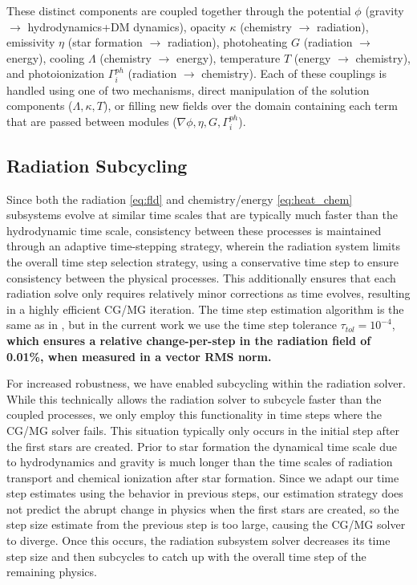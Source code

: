 These distinct components are coupled together through the potential
$\phi$ (gravity $\to$ hydrodynamics+DM dynamics), opacity $\kappa$ (chemistry
$\to$ radiation), emissivity $\eta$ (star formation $\to$ radiation),
photoheating $G$ (radiation $\to$ energy), cooling $\Lambda$
(chemistry $\to$ energy), temperature $T$ (energy $\to$ chemistry),
and photoionization $\Gamma_i^{ph}$ (radiation $\to$ chemistry).  Each
of these couplings is handled using one of two mechanisms, direct
manipulation of the solution components ($\Lambda, \kappa, T$), or
filling new fields over the domain containing each term that are
passed between modules ($\nabla\phi, \eta, G, \Gamma_i^{ph}$).

\subsection{Radiation Subcycling}
Since both the radiation \eqref{eq:fld} and chemistry/energy
\eqref{eq:heat_chem} subsystems evolve at similar time scales that are
typically much faster than the hydrodynamic time scale, consistency
between these processes is maintained through an adaptive
time-stepping strategy, wherein the radiation system limits the
overall time step selection strategy, using a conservative time step
to ensure consistency between the physical processes.  This
additionally ensures that each radiation solve only requires
relatively minor corrections as time evolves, resulting in a highly
efficient CG/MG iteration.  The time step estimation algorithm is the
same as in \cite{ReynoldsHayesPaschosNorman2009}, but in the current
work we use the time step tolerance $\tau_{tol} = 10^{-4}$, {\bf which
ensures a relative change-per-step in the radiation field of 0.01\%,
when measured in a vector RMS norm. }




For increased robustness, we have enabled subcycling within the
radiation solver.  While this technically allows the radiation solver
to subcycle faster than the coupled processes, we only employ this
functionality in time steps where the CG/MG solver fails.  This
situation typically only occurs in the initial step after the first
stars are created.  Prior to star formation the dynamical time scale
due to hydrodynamics and gravity is much longer than the time scales
of radiation transport and chemical ionization after star formation.
Since we adapt our time step estimates using the behavior in previous
steps, our estimation strategy does not predict the abrupt change in
physics when the first stars are created, so the step size estimate from
the previous step is too large, causing the CG/MG solver to diverge.
Once this occurs, the radiation subsystem solver decreases its time
step size and then subcycles to catch up with the overall time step of
the remaining physics.

